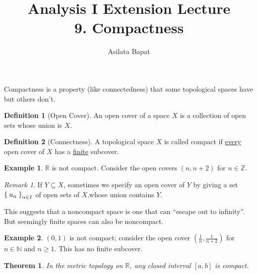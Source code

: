 \documentclass[12pt]{amsart}
\title[Compactness]
	{Analysis I Extension Lecture\\9. Compactness}
\author{Asilata Bapat}
\newcommand{\bbR}{\mathbb{R}}
\newcommand{\bbN}{\mathbb{N}}
\newcommand{\bbZ}{\mathbb{Z}}
\theoremstyle{plain}
\newtheorem*{thm}{Theorem}
\theoremstyle{remark}
\newtheorem*{rmk}{Remark}
\theoremstyle{definition}
\newtheorem*{define}{Definition}
\newtheorem*{eg}{Example}
\begin{document}
\maketitle

Compactness is a property (like connectedness) that some topological spaces have but others don't.
\begin{define}[Open Cover]
An open cover of a space $X$ is a collection of open sets whose union is $X$.
\end{define}

\begin{define}[Connectness]
A topological space $X$ is called compact if \underline{every} open cover of $X$ has a \underline{finite} subcover.
\end{define}

\begin{eg}
$\bbR$ is not compact. Consider the open covers $(n, n+2)$ for $n \in \bbZ$.
\end{eg}
\begin{rmk}
If $Y \subseteq X$, sometimes we specify an open cover of $Y$ by giving a set $\Set{u_{\alpha}}_{\alpha \in I}$ of open sets of $X$,whose union contains $Y$.
\end{rmk}

This suggests that a noncompact space is one that can ``escape out to infinity''. But seemingly finite spaces can also be noncompact. 

\begin{eg}
$(0,1)$ is not compact; consider the open cover $(\frac{1}{n}, \frac{1}{n+2})$ for $n \in \bbN$ and $n \geqslant 1$. This has no finite subcover.
\end{eg}

\begin{thm}
In the metric topology on $\bbR$, any closed interval $[a, b]$ is compact.
\end{thm}
\end{document}

